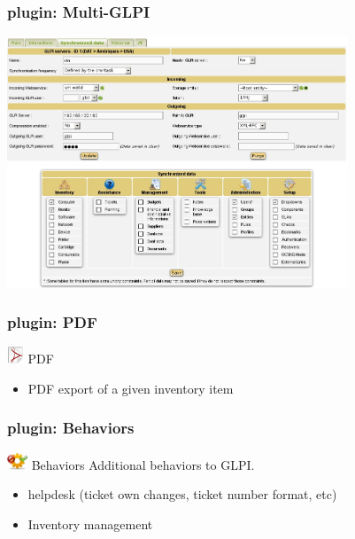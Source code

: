 \documentclass{beamer}
\begin{document}
\begin{frame}
    \frametitle{plugin: Multi-GLPI}

    \includegraphics[height=7.5cm]{./pics/multiglpi/multiGLPi.jpg}




\end{frame}



\begin{frame}
    \frametitle{plugin: PDF}

    \begin{block}{\includegraphics[height=0.5cm]{./pics/plugins/pdf.jpg} PDF}
        \begin{itemize}
            \item PDF export of a given inventory item
        \end{itemize}
    \end{block}

\end{frame}

\begin{frame}
    \frametitle{plugin: Behaviors}

    \begin{block}{\includegraphics[height=0.5cm]{./pics/plugins/behaviors.jpg} Behaviors}
        Additional behaviors to GLPI.
        \begin{itemize}
            \item helpdesk (ticket own changes, ticket number format, etc)
            \item Inventory management
        \end{itemize}
    \end{block}

\end{frame}
\end{document}
